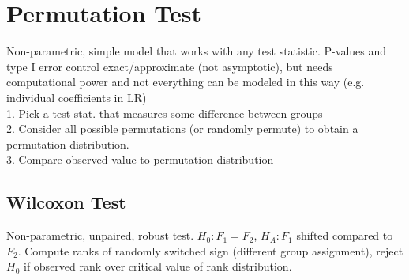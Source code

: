 \section*{Permutation Test}
Non-parametric, simple model that works with any test statistic. P-values and type I error control exact/approximate (not asymptotic), but needs computational power and not everything can be modeled in this way (e.g. individual coefficients in LR) \\
{1. Pick a test stat. that measures some difference between groups}\\
{2. Consider all possible permutations (or randomly permute) to obtain a permutation distribution.}\\
{3. Compare observed value to permutation distribution}\\

\subsection*{Wilcoxon Test}
Non-parametric, unpaired, robust test. $H_0: F_1 = F_2$, $H_A: F_1 $ shifted compared to $F_2$. Compute ranks of randomly switched sign (different group assignment), reject $H_0$ if observed rank over critical value of rank distribution.


